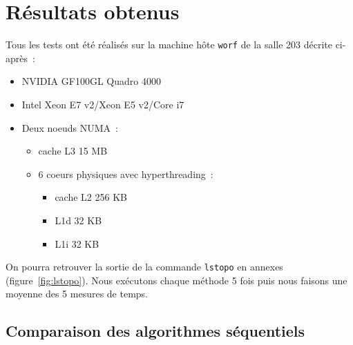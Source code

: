 \section {Résultats obtenus}

Tous les tests ont été réalisés sur la machine hôte \texttt{worf} de
la salle 203 décrite ci-après~:
\begin{itemize}
\item NVIDIA GF100GL Quadro 4000
\item Intel Xeon E7 v2/Xeon E5 v2/Core i7
\item Deux noeuds NUMA~:
  \begin{itemize}
  \item cache L3 15 MB
  \item 6 coeurs physiques avec hyperthreading~:
    \begin{itemize}
    \item cache L2 256 KB
    \item L1d 32 KB
    \item L1i 32 KB
    \end{itemize}
  \end{itemize}
\end{itemize}
On pourra retrouver la sortie de la commande \texttt{lstopo} en
annexes (figure~\ref{fig:lstopo}). Nous exécutons chaque méthode 5
fois puis nous faisons une moyenne des 5 mesures de temps.

\subsection{Comparaison des algorithmes séquentiels}

\begin{figure}[!ht]
  \caption{}
  \label{fig:homoseq128}
\end{figure}

\begin{figure}[!ht]
  \caption{}
  \label{fig:homoseq512}
\end{figure}

